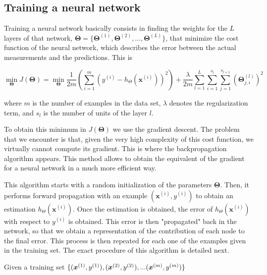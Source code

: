 \documentclass[a4paper, report, oneside, UKenglish]{memoir}
\DeclarePairedDelimiter{\set}{\lbrace}{\rbrace} %
\newcommand{\x}{\boldsymbol{x}}
\newcommand{\bTheta}{\boldsymbol{\Theta}}
\begin{document}
\subsection{Training a neural network}
Training a neural network basically consists in finding the weights for the $L$ layers of that network, $\bTheta = \{\bTheta^{(1)}, \bTheta^{(2)}, ..., \bTheta^{(L)}\}$, that minimize the cost function of the neural network, which describes the error between the actual measurements and the predictions. This is

\begin{equation}
    \min_{\bTheta} J(\bTheta) = \min_{\bTheta} \frac{1}{2m} \left(\sum_{i=1}^{m} \left(y^{(i)} - h_\Theta (\x^{(i)}) \right)^2 \right) + \frac{\lambda}{2m} \sum_{l=1}^{L} \sum_{i=1}^{s_l} \sum_{j=1}^{s_{l+1}} (\bTheta_{j,i}^{(l)})^2
\end{equation}

where $m$ is the number of examples in the data set, $\lambda$ denotes the regularization term, and $s_l$ is the number of units of the layer $l$.

To obtain this minimum in $J(\bTheta)$ we use the gradient descent. The problem that we encounter is that, given the very high complexity of this cost function, we virtually cannot compute its gradient. This is where the backpropagation algorithm appears. This method allows to obtain the equivalent of the gradient for a neural network in a much more efficient way.

This algorithm starts with a random initialization of the parameters $\bTheta$. Then, it performs forward propagation with an example $(\x^{(i)}, y^{(i)})$ to obtain an estimation $h_\Theta(\x^{(i)})$. Once the estimation is obtained, the error of $h_\Theta(\x^{(i)})$ with respect to $y^{(i)}$ is obtained. This error is then "propagated" back in the network, so that we obtain a representation of the contribution of each node to the final error. This process is then repeated for each one of the examples given in the training set. The exact procedure of this algorithm is detailed next.

Given a training set $\set{(\x^{(1)}, y^{(1)}), (\x^{(2)}, y^{(2)}), ... (\x^{(m)}, y^{(m)})}$
\end{document}
